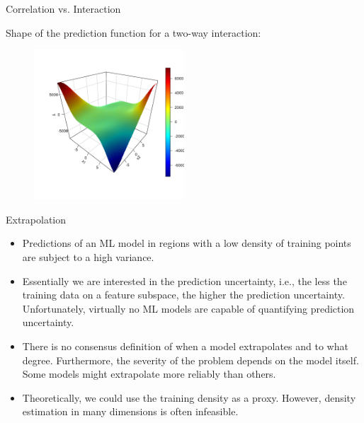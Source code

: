 \documentclass[11pt,compress,t,notes=noshow, aspectratio=169, xcolor=table]{beamer}
\begin{document}
\begin{frame}{Correlation vs. Interaction}

Shape of the prediction function for a two-way interaction:

\begin{figure}
\includegraphics[width = 0.5\textwidth]{figure/interaction}
\end{figure}
\end{frame}


\begin{frame}{Extrapolation}
\begin{itemize}
\item Predictions of an ML model in regions with a low density of training points are subject to a high variance.
\item Essentially we are interested in the prediction uncertainty, i.e., the less the training data on a feature subspace, the higher the prediction uncertainty. Unfortunately, virtually no ML models are capable of quantifying prediction uncertainty.
\item There is no consensus definition of when a model extrapolates and to what degree. Furthermore, the severity of the problem depends on the model itself. Some models might extrapolate more reliably than others.
\item Theoretically, we could use the training density as a proxy. However, density estimation in many dimensions is often infeasible.
\end{itemize}

\end{frame}
\end{document}

